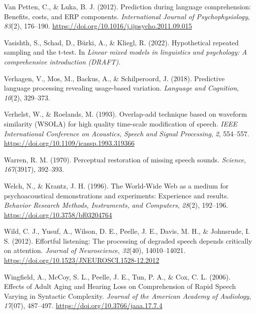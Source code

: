\documentclass[a4paper, nobind]{templates/ociamthesis}
\newlength{\cslhangindent}
\newenvironment{CSLReferences}[2] %
 {%
  \setlength{\parindent}{0pt}
  \ifodd #1
  \let\oldpar\par
  \def\par{\hangindent=\cslhangindent\oldpar}
  \fi
  \setlength{\parskip}{1mm}
  \setlength{\baselineskip}{6mm}
 }%
 {}
\begin{document}
\begin{CSLReferences}{1}{0}
\leavevmode{}%
Van Petten, C., \& Luka, B. J. (2012). {Prediction during language comprehension: Benefits, costs, and ERP components}. \emph{International Journal of Psychophysiology}, \emph{83}(2), 176--190. \url{https://doi.org/10.1016/j.ijpsycho.2011.09.015}

\leavevmode{}%
Vasishth, S., Schad, D., Bürki, A., \& Kliegl, R. (2022). Hypothetical repeated sampling and the t-test. In \emph{Linear mixed models in linguistics and psychology: A comprehensive introduction (DRAFT)}.

\leavevmode{}%
Verhagen, V., Mos, M., Backus, A., \& Schilperoord, J. (2018). Predictive language processing revealing usage-based variation. \emph{Language and Cognition}, \emph{10}(2), 329--373.

\leavevmode{}%
Verhelst, W., \& Roelands, M. (1993). {Overlap-add technique based on waveform similarity (WSOLA) for high quality time-scale modification of speech}. \emph{IEEE International Conference on Acoustics, Speech and Signal Processing}, \emph{2}, 554--557. \url{https://doi.org/10.1109/icassp.1993.319366}

\leavevmode{}%
Warren, R. M. (1970). Perceptual restoration of missing speech sounds. \emph{Science}, \emph{167}(3917), 392--393.

\leavevmode{}%
Welch, N., \& Krantz, J. H. (1996). {The World-Wide Web as a medium for psychoacoustical demonstrations and experiments: Experience and results}. \emph{Behavior Research Methods, Instruments, and Computers}, \emph{28}(2), 192--196. \url{https://doi.org/10.3758/bf03204764}

\leavevmode{}%
Wild, C. J., Yusuf, A., Wilson, D. E., Peelle, J. E., Davis, M. H., \& Johnsrude, I. S. (2012). {Effortful listening: The processing of degraded speech depends critically on attention}. \emph{Journal of Neuroscience}, \emph{32}(40), 14010--14021. \url{https://doi.org/10.1523/JNEUROSCI.1528-12.2012}

\leavevmode{}%
Wingfield, A., McCoy, S. L., Peelle, J. E., Tun, P. A., \& Cox, C. L. (2006). Effects of Adult Aging and Hearing Loss on Comprehension of Rapid Speech Varying in Syntactic Complexity. \emph{Journal of the American Academy of Audiology}, \emph{17}(07), 487--497. \url{https://doi.org/10.3766/jaaa.17.7.4}


\end{CSLReferences}
\end{document}
